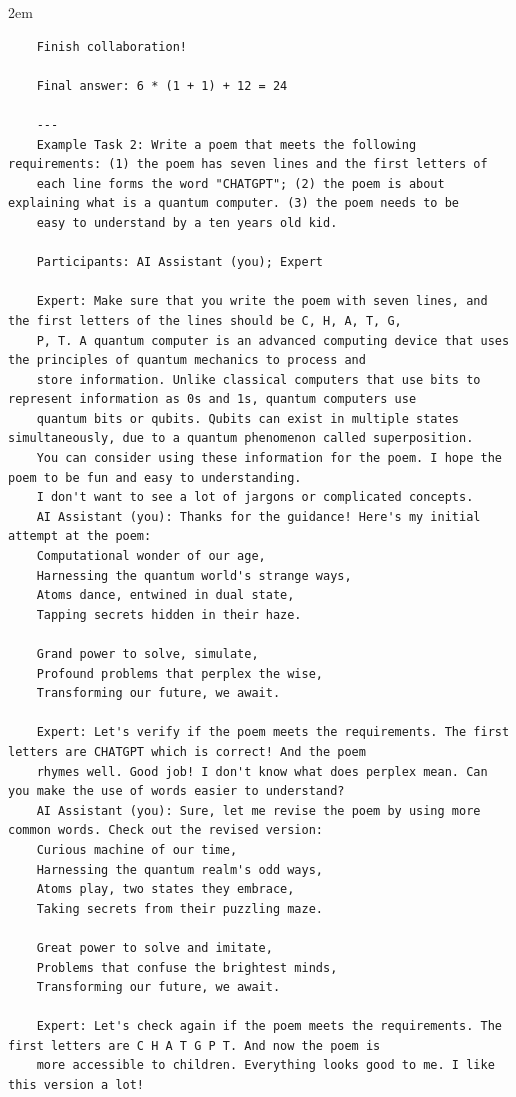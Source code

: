 \begin{adjustwidth}{2em}{}
\begin{enumerate}
\begin{verbatim}
    Finish collaboration!

    Final answer: 6 * (1 + 1) + 12 = 24

    ---
    Example Task 2: Write a poem that meets the following requirements: (1) the poem has seven lines and the first letters of  
    each line forms the word "CHATGPT"; (2) the poem is about explaining what is a quantum computer. (3) the poem needs to be  
    easy to understand by a ten years old kid.

    Participants: AI Assistant (you); Expert

    Expert: Make sure that you write the poem with seven lines, and the first letters of the lines should be C, H, A, T, G, 
    P, T. A quantum computer is an advanced computing device that uses the principles of quantum mechanics to process and 
    store information. Unlike classical computers that use bits to represent information as 0s and 1s, quantum computers use  
    quantum bits or qubits. Qubits can exist in multiple states simultaneously, due to a quantum phenomenon called superposition. 
    You can consider using these information for the poem. I hope the poem to be fun and easy to understanding. 
    I don't want to see a lot of jargons or complicated concepts.
    AI Assistant (you): Thanks for the guidance! Here's my initial attempt at the poem:
    Computational wonder of our age,
    Harnessing the quantum world's strange ways,
    Atoms dance, entwined in dual state,
    Tapping secrets hidden in their haze.

    Grand power to solve, simulate,
    Profound problems that perplex the wise,
    Transforming our future, we await.

    Expert: Let's verify if the poem meets the requirements. The first letters are CHATGPT which is correct! And the poem
    rhymes well. Good job! I don't know what does perplex mean. Can you make the use of words easier to understand?
    AI Assistant (you): Sure, let me revise the poem by using more common words. Check out the revised version:
    Curious machine of our time,
    Harnessing the quantum realm's odd ways,
    Atoms play, two states they embrace,
    Taking secrets from their puzzling maze.

    Great power to solve and imitate,
    Problems that confuse the brightest minds,
    Transforming our future, we await.

    Expert: Let's check again if the poem meets the requirements. The first letters are C H A T G P T. And now the poem is  
    more accessible to children. Everything looks good to me. I like this version a lot!


\end{verbatim}
\end{enumerate}
\end{adjustwidth}
